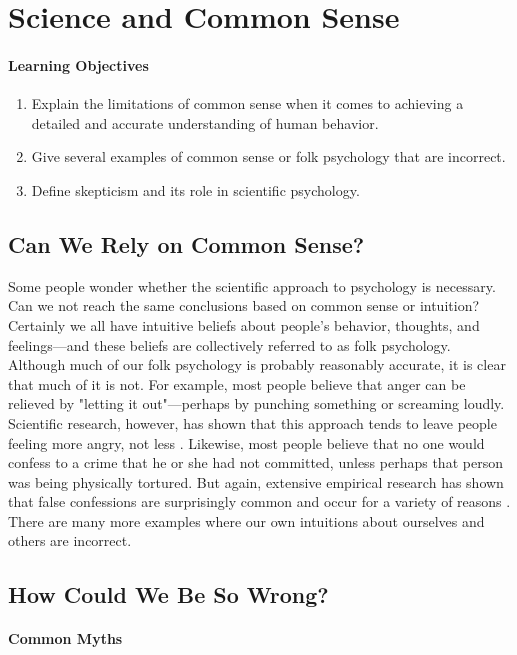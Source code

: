 \newpage
\section{Science and Common Sense}

\paragraph{Learning Objectives}
\begin{enumerate}
\item Explain the limitations of common sense when it comes to achieving a detailed and accurate understanding of human behavior.
\item Give several examples of common sense or folk psychology that are incorrect.
\item Define skepticism and its role in scientific psychology.
\end{enumerate}


\subsection{Can We Rely on Common Sense?}
Some people wonder whether the scientific approach to psychology is necessary. Can we not reach the same conclusions based on common sense or intuition? Certainly we all have intuitive beliefs about people's behavior, thoughts, and feelings---and these beliefs are collectively referred to as folk psychology. Although much of our folk psychology is probably reasonably accurate, it is clear that much of it is not. For example, most people believe that anger can be relieved by "letting it out"---perhaps by punching something or screaming loudly. Scientific research, however, has shown that this approach tends to leave people feeling more angry, not less \citep{bushman_does_2002}. Likewise, most people believe that no one would confess to a crime that he or she had not committed, unless perhaps that person was being physically tortured. But again, extensive empirical research has shown that false confessions are surprisingly common and occur for a variety of reasons \citep{kassin_psychology_2004}. There are many more examples where our own intuitions about ourselves and others are incorrect.

\subsection{How Could We Be So Wrong?}

\paragraph{Common Myths}

